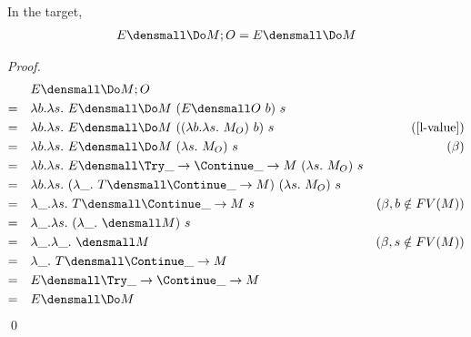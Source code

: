 \begin{lemma}
  \label{thm:ext-commit}
  In the target,
  \begin{align*}
    E\den{\Do M; O} = E\den{\Do M}
  \end{align*}
\end{lemma}
\begin{proof}
  \begin{align*}
    &\quad
    E\den{\Do M; O}
    \\
    =& \quad
    \lambda b. \lambda s.~ E\den{\Do M} ~(E\den{O} ~b) ~s
    \\
    =& \quad
    \lambda b. \lambda s.~ E\den{\Do M} ~((\lambda b. \lambda s.~ M_O) ~b) ~s
    & (\cref{l-value})
    \\
    =& \quad
    \lambda b. \lambda s.~ E\den{\Do M} ~(\lambda s.~ M_O) ~s
    & (\beta)
    \\
    =& \quad
    \lambda b. \lambda s.~ E\den{\Try \_ \to \Continue \_ \to M} ~(\lambda s.~ M_O) ~s
    \\
    =& \quad
    \lambda b. \lambda s.~ (\lambda \_. ~T\den{\Continue \_ \to M}) ~(\lambda s.~ M_O) ~s
    \\
    =& \quad
    \lambda \_. \lambda s.~ T\den{\Continue \_ \to M} ~s
    & (\beta, b \notin FV(M))
    \\
    =& \quad
    \lambda \_. \lambda s.~ (\lambda \_. ~ \den{M}) ~s
    \\
    =& \quad
    \lambda \_. \lambda \_.~ \den{M}
    & (\beta, s \notin FV(M))
    \\
    =& \quad
    \lambda \_. ~T\den{\Continue \_ \to M}
    \\
    =&\quad
    E\den{\Try \_ \to \Continue \_ \to M}
    \\
    =&\quad
    E\den{\Do M}
  \end{align*}
  \qed
\end{proof}

